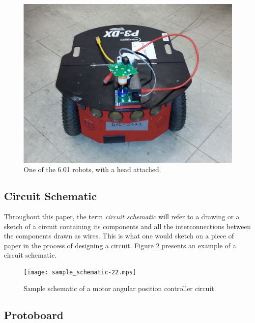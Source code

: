 \begin{figure}
\begin{center}
\includegraphics[width=\textwidth]{Images/robot.jpeg}
\caption[6.01 robot]{One of the 6.01 robots, with a head attached.}
\label{fig:robot}
\end{center}
\end{figure}

\subsection{Circuit Schematic}

Throughout this paper, the term \textit{circuit schematic} will refer to a
drawing or a sketch of a circuit containing its components and all the
interconnections between the components drawn as wires. This is what one would
sketch on a piece of paper in the process of designing a circuit. Figure
\ref{fig:schematic} presents an example of a circuit schematic.

\begin{figure}
\begin{center}
\texttt{[image: sample\_schematic-22.mps]}
\caption[Sample circuit schematic]{Sample schematic of a motor angular position
controller circuit.}
\label{fig:schematic}
\end{center}
\end{figure}

\subsection{Protoboard}
\label{sec:what_is_protoboard}

